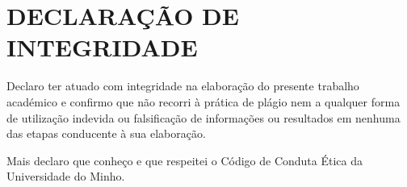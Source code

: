 \chapter*{DECLARAÇÃO DE INTEGRIDADE}

Declaro ter atuado com integridade na elaboração do presente trabalho académico e confirmo que não recorri à prática de plágio nem a qualquer forma de utilização indevida ou falsificação de informações ou resultados em nenhuma das etapas conducente à sua elaboração.

Mais declaro que conheço e que respeitei o Código de Conduta Ética da Universidade do Minho.